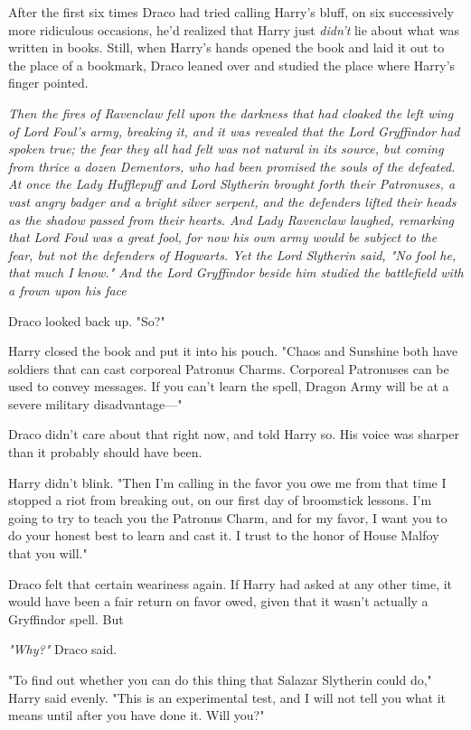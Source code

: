 After the first six times Draco had tried calling Harry's bluff, on six
successively more ridiculous occasions, he'd realized that Harry just
\emph{didn't} lie about what was written in books. Still, when Harry's hands
opened the book and laid it out to the place of a bookmark, Draco leaned over
and studied the place where Harry's finger pointed.

\emph{Then the fires of Ravenclaw fell upon the darkness that had cloaked the
left wing of Lord Foul's army, breaking it, and it was revealed that the Lord
Gryffindor had spoken true; the fear they all had felt was not natural in its
source, but coming from thrice a dozen Dementors, who had been promised the
souls of the defeated. At once the Lady Hufflepuff and Lord Slytherin brought
forth their Patronuses, a vast angry badger and a bright silver serpent, and
the defenders lifted their heads as the shadow passed from their hearts. And
Lady Ravenclaw laughed, remarking that Lord Foul was a great fool, for now his
own army would be subject to the fear, but not the defenders of Hogwarts. Yet
the Lord Slytherin said, "No fool he, that much I know." And the Lord
Gryffindor beside him studied the battlefield with a frown upon his
face{\el}}

Draco looked back up. "So?"

Harry closed the book and put it into his pouch. "Chaos and Sunshine both have
soldiers that can cast corporeal Patronus Charms. Corporeal Patronuses can be
used to convey messages. If you can't learn the spell, Dragon Army will be at a
severe military disadvantage\mbox{---}"

Draco didn't care about that right now, and told Harry so. His voice was
sharper than it probably should have been.

Harry didn't blink. "Then I'm calling in the favor you owe me from that time I
stopped a riot from breaking out, on our first day of broomstick lessons. I'm
going to try to teach you the Patronus Charm, and for my favor, I want you to
do your honest best to learn and cast it. I trust to the honor of House Malfoy
that you will."

Draco felt that certain weariness again. If Harry had asked at any other time,
it would have been a fair return on favor owed, given that it wasn't actually a
Gryffindor spell. But{\el}

\emph{"Why?"} Draco said.

"To find out whether you can do this thing that Salazar Slytherin could do,"
Harry said evenly. "This is an experimental test, and I will not tell you what
it means until after you have done it. Will you?"

